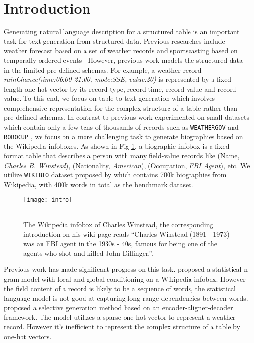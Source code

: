 \documentclass[letterpaper]{article} \usepackage{aaai18}  \usepackage{times}  \usepackage{helvet}  \usepackage{courier}  \usepackage{url}  \usepackage{graphicx}  \frenchspacing  \setlength{\pdfpagewidth}{8.5in}  \setlength{\pdfpageheight}{11in}  \usepackage{amsmath}
\begin{document}
\section{Introduction}
Generating natural language description for a structured table is an important task for text generation from structured data.
Previous researches include weather forecast based on a set of  weather records  \cite{liang2009learning} and sportscasting based on temporally ordered events  \cite{chen2008learning}. 
However, previous work models the structured data in the limited pre-defined schemas. For example, a weather record \textit{rainChance(time:06:00-21:00, mode:SSE, value:20)} is represented by a fixed-length one-hot vector by its record type, record time, record value and record value.
To this end, we focus on table-to-text generation which involves comprehensive representation for the complex structure of a table rather than pre-defined schemas.
In contrast to previous work experimented on small datasets which contain only a few tens of thousands of records such as 
\texttt{WEATHERGOV} \cite{liang2009learning} and \texttt{ROBOCUP} \cite{chen2008learning}, 
we focus on a more challenging task to generate biographies based on the Wikipedia infoboxes. 
As shown in Fig \ref{table1}, a biographic infobox is a fixed-format table that describes a person with many field-value records like (Name,\textit{ Charles B. Winstead}), (Nationality, \textit{American}), (Occupation, \textit{FBI Agent}), etc. 
We utilize \texttt{WIKIBIO} dataset proposed by \citeauthor{lebret2016neural}  which contains 700k biographies from Wikipedia, with 400k words in total as the benchmark dataset. 

\begin{figure}[t]
\centering
\texttt{[image: intro]}
\begin{tabular}{@{}c@{}@{}c@{}@{}c@{}@{}c@{}}
\end{tabular}
\caption{The Wikipedia infobox of Charles Winstead, the corresponding introduction on his wiki page reads ``Charles Winstead (1891 {}- 1973) was an FBI agent in the 1930s -{} 40s, famous for being one of the agents who shot and killed John Dillinger.''.}\label{table1}
\end{figure} 

Previous work has made significant progress on this task.
\citeauthor{lebret2016neural}  proposed a statistical n-gram model with local and global conditioning on a Wikipedia infobox. 
However the field content of a record is likely to be a sequence of words, the statistical language model is not good at capturing long-range dependencies between words.  
\citeauthor{mei2015talk} 
proposed a selective generation method based on an encoder-aligner-decoder framework. 
The model utilizes a sparse one-hot vector to represent a weather record.
However it's inefficient to represent the complex structure of a table by one-hot vectors.
\end{document}
